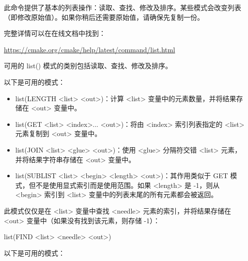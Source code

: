 

此命令提供了基本的列表操作：读取、查找、修改及排序。某些模式会改变列表（即修改原始值）。如果你稍后还需要原始值，请确保先复制一份。

完整详情可以在在线文档中找到：

\url{https://cmake.org/cmake/help/latest/command/list.html}

可用的 list() 模式的类别包括读取、查找、修改及排序。


以下是可用的模式：

\begin{itemize}
\item
list(LENGTH <list> <out>)：计算 <list> 变量中的元素数量，并将结果存储在 <out> 变量中。

\item
list(GET <list> <index>... <out>)：将由 <index> 索引列表指定的 <list> 元素复制到 <out> 变量中。

\item
list(JOIN <list> <glue> <out>)：使用 <glue> 分隔符交错 <list> 元素，并将结果字符串存储在 <out> 变量中。

\item
list(SUBLIST <list> <begin> <length> <out>)：其作用类似于 GET 模式，但不是使用显式索引而是使用范围。如果 <length> 是 -1，则从 <begin> 索引到 <list> 变量中的列表末尾的所有元素都会被返回。
\end{itemize}


此模式仅仅是在 <list> 变量中查找 <needle> 元素的索引，并将结果存储在 <out> 变量中（如果没有找到该元素，则存储 -1）：

\begin{cmake}
list(FIND <list> <needle> <out>)
\end{cmake}


以下是可用的模式：

